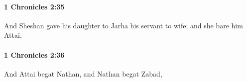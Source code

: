 		\paragraph{1 Chronicles 2:35} %
			\label{1CHRONICLES-2-35}

			And Sheshan gave his daughter to Jarha his servant to wife; and she bare him Attai.


		\paragraph{1 Chronicles 2:36} %
			\label{1CHRONICLES-2-36}

			And Attai begat Nathan, and Nathan begat Zabad,


